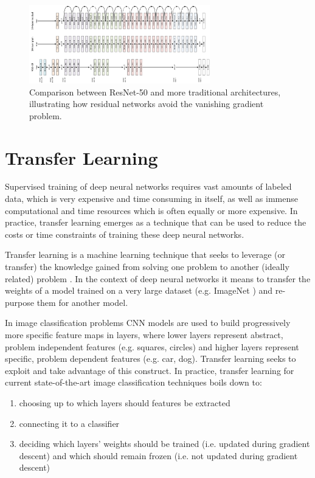 \begin{figure}[ht]
    \centering
    \includegraphics[width=0.7\textwidth]{figs/resnet50.png}
    \caption{Comparison between ResNet-50 and more traditional architectures, illustrating how residual networks avoid the vanishing gradient problem.}
    \label{fig:resnet50}
\end{figure}

\section{Transfer Learning}
\label{section:transferlearning}

Supervised training of deep neural networks requires vast amounts of labeled data, which is very expensive and time consuming in itself, as well as immense computational and time resources which is often equally or more expensive. In practice, transfer learning emerges as a technique that can be used to reduce the costs or time constraints of training these deep neural networks.

Transfer learning is a machine learning technique that seeks to leverage (or transfer) the knowledge gained from solving one problem to another (ideally related) problem \cite{deeptransferlearning}. In the context of deep neural networks it means to transfer the weights of a model trained on a very large dataset (e.g. ImageNet \cite{imagenet}) and re-purpose them for another model.

In image classification problems \ac{CNN} models are used to build progressively more specific feature maps in layers, where lower layers represent abstract, problem independent features (e.g. squares, circles) and higher layers represent specific, problem dependent features (e.g. car, dog). Transfer learning seeks to exploit and take advantage of this construct. In practice, transfer learning for current state-of-the-art image classification techniques boils down to:

\begin{enumerate}
    \item choosing up to which layers should features be extracted
    \item connecting it to a classifier
    \item deciding which layers' weights should be trained (i.e. updated during gradient descent) and which should remain frozen (i.e. not updated during gradient descent)
\end{enumerate}

